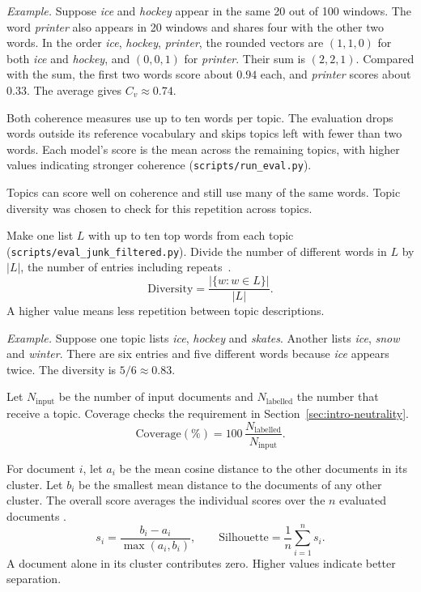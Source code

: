 \begin{description}[leftmargin=1.3em,style=nextline,itemsep=3pt]
\emph{Example.} Suppose \emph{ice} and \emph{hockey} appear in the same 20 out of 100 windows.
The word \emph{printer} also appears in 20 windows and shares four with the other two words.
In the order \emph{ice}, \emph{hockey}, \emph{printer}, the rounded vectors are
$(1,1,0)$ for both \emph{ice} and \emph{hockey}, and $(0,0,1)$ for \emph{printer}.
Their sum is $(2,2,1)$. Compared with the sum, the first two words score about $0.94$ each,
and \emph{printer} scores about $0.33$. The average gives $C_v\approx0.74$.

Both coherence measures use up to ten words per topic. The evaluation drops words outside
its reference vocabulary and skips topics left with fewer than two words. Each model's
score is the mean across the remaining topics, with higher values indicating stronger
coherence (\texttt{scripts/run\_eval.py}).

\item[Topic diversity.]
Topics can score well on coherence and still use many of the same words. Topic diversity
was chosen to check for this repetition across topics.

Make one list $L$ with up to ten top words from each topic
(\texttt{scripts/}\allowbreak\texttt{eval\_junk\_filtered.py}). Divide the number of different
words in $L$ by $|L|$, the number of entries including repeats~\cite[p.~448]{dieng2020etm}.
\[
  \mathrm{Diversity}=\frac{|\{w:w\in L\}|}{|L|}.
\]
A higher value means less repetition between topic descriptions.

\emph{Example.} Suppose one topic lists \emph{ice}, \emph{hockey} and \emph{skates}.
Another lists \emph{ice}, \emph{snow} and \emph{winter}. There are six entries and five
different words because \emph{ice} appears twice. The diversity is $5/6\approx0.83$.

\item[Coverage.]
Let $N_{\mathrm{input}}$ be the number of input documents and $N_{\mathrm{labelled}}$ the
number that receive a topic. Coverage checks the requirement in
Section~\ref{sec:intro-neutrality}.
\[
  \mathrm{Coverage}(\%)=100\,\frac{N_{\mathrm{labelled}}}{N_{\mathrm{input}}}.
\]

\item[Silhouette.]
For document $i$, let $a_i$ be the mean cosine distance to the other documents in its
cluster. Let $b_i$ be the smallest mean distance to the documents of any other cluster.
The overall score averages the individual scores over the $n$ evaluated documents
\cite[pp.~55--56,~59]{rousseeuw1987silhouette}.
\[
  s_i=\frac{b_i-a_i}{\max(a_i,b_i)},\qquad
  \mathrm{Silhouette}=\frac{1}{n}\sum_{i=1}^{n}s_i.
\]
A document alone in its cluster contributes zero. Higher values indicate better separation.


\end{description}
